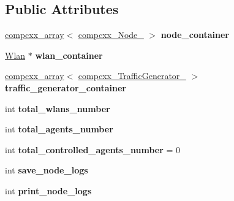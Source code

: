 \subsection*{Public Attributes}
\begin{DoxyCompactItemize}
\item 
\mbox{\label{classcompcxx__Komondor__27_a692da1796d5382c731ffd5409efa568f}} 
\hyperlink{classcompcxx__array}{compcxx\+\_\+array}$<$ \hyperlink{classcompcxx__Node__23}{compcxx\+\_\+\+Node\+\_} $>$ {\bfseries node\+\_\+container}
\item 
\mbox{\label{classcompcxx__Komondor__27_a3d2dabf215a7d2507a027b68a368aca6}} 
\hyperlink{structWlan}{Wlan} $\ast$ {\bfseries wlan\+\_\+container}
\item 
\mbox{\label{classcompcxx__Komondor__27_ad10bf64db052746ed6722bc10d39f67b}} 
\hyperlink{classcompcxx__array}{compcxx\+\_\+array}$<$ \hyperlink{classcompcxx__TrafficGenerator__24}{compcxx\+\_\+\+Traffic\+Generator\+\_} $>$ {\bfseries traffic\+\_\+generator\+\_\+container}
\item 
\mbox{\label{classcompcxx__Komondor__27_affd3dde760ede4b09250ba72b9ce55d1}} 
int {\bfseries total\+\_\+wlans\+\_\+number}
\item 
\mbox{\label{classcompcxx__Komondor__27_a02563f280ffb977aba7a7fa7bdb35a7f}} 
int {\bfseries total\+\_\+agents\+\_\+number}
\item 
\mbox{\label{classcompcxx__Komondor__27_aa1a8144a72ea5bc1c03e460817cb2dc2}} 
int {\bfseries total\+\_\+controlled\+\_\+agents\+\_\+number} = 0
\item 
\mbox{\label{classcompcxx__Komondor__27_a244efdc09681b32a68281bf518ecf96f}} 
int {\bfseries save\+\_\+node\+\_\+logs}
\item 
\mbox{\label{classcompcxx__Komondor__27_aa541b81abcef052371ac1b51a089868d}} 
int {\bfseries print\+\_\+node\+\_\+logs}
\item 
\mbox{\label{classcompcxx__Komondor__27_a7437c9f3c822ef29adeed7b7a36d4180}} 

\end{DoxyCompactItemize}

